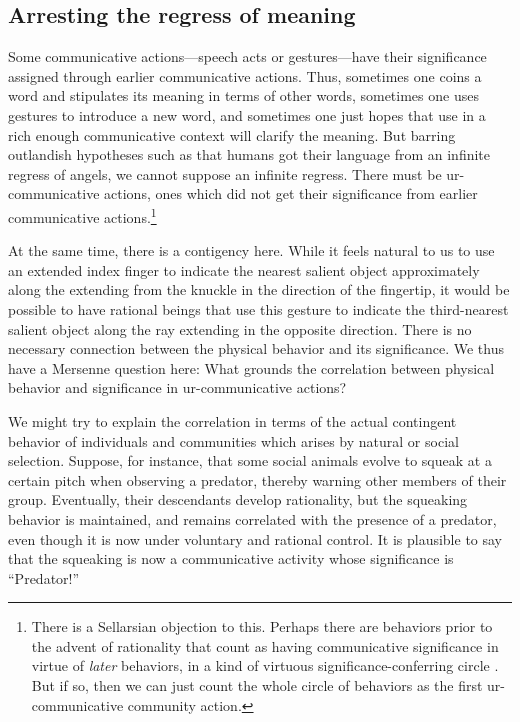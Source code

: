 \subsection{Arresting the regress of meaning}
Some communicative actions---speech acts or gestures---have their significance assigned through earlier communicative 
actions. Thus, sometimes one coins a word and stipulates its meaning in terms of other words, sometimes one uses gestures
to introduce a new word, and sometimes one just hopes that use in a rich enough communicative context will clarify the
meaning. But barring outlandish hypotheses such as that humans got their language from an
infinite regress of angels, we cannot suppose an infinite regress. There must be ur-communicative actions, ones which did not get
their significance from earlier communicative actions.\footnote{There is a Sellarsian objection to this. Perhaps there are 
behaviors prior to the advent of rationality that count as having communicative significance in virtue of \textit{later}
behaviors, in a kind of virtuous significance-conferring circle . But if so, then we can just count the whole circle 
of behaviors as the first ur-communicative community action.}

At the same time, there is a contigency here. While it feels natural to us to use an extended index
finger to indicate the nearest salient object approximately along the  extending from the knuckle in the direction of
the fingertip, it would be possible to have rational beings that use this gesture to indicate the third-nearest salient
object along the ray extending in the opposite direction. There is no necessary connection between the
physical behavior and its significance. We thus have a Mersenne question here: What grounds the correlation between
physical behavior and significance in ur-communicative actions?

We might try to explain the correlation in terms of the actual contingent behavior of individuals and communities
which arises by natural or social selection. Suppose, for instance, that some social animals evolve to squeak at 
a certain pitch when observing a predator, thereby warning other members of their group. Eventually, their descendants
develop rationality, but the squeaking behavior is maintained, and remains correlated with the presence of a predator, even 
though it is now under voluntary and rational control. It is plausible to say that the squeaking is now a communicative
activity whose significance is ``Predator!'' 

